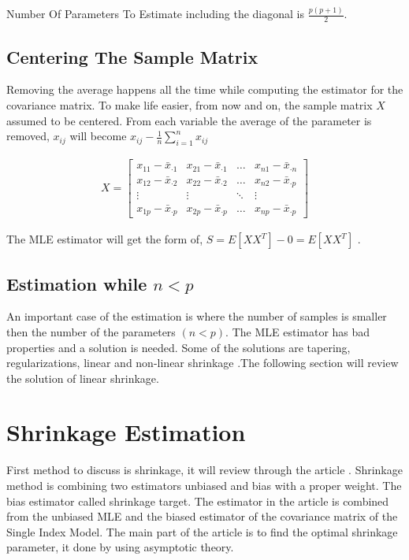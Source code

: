 \documentclass[letterpaper]{article}
\begin{document}
	Number Of Parameters To Estimate including the diagonal is \(\frac{p(p + 1)}{2} \).
	
	
	\subsection{Centering The Sample Matrix}	 
	Removing the average happens all the time while computing the estimator for the covariance
	matrix. To make life easier, from now and on, the sample matrix \(X\) assumed to be centered. From each variable the average of the parameter is removed, \(x_{ij}\)  will become \(x_{ij} -  \frac{1}{n} \sum_{i=1}^{n}x_{ij} \)
	
	
	\begin{align*} 
	X =
	\begin{bmatrix}
	x_{11} - \bar{x}_{\cdot 1} & x_{21} - \bar{x}_{\cdot 1} & \dots     & x_{n1} -\bar{x}_{\cdot n} \\
	x_{12} - \bar{x}_{\cdot 2} & x_{22} - \bar{x}_{\cdot 2} & \dots     & x_{n2} -\bar{x}_{\cdot p} \\
	\vdots  & \vdots  & \ddots  & \vdots  \\
	x_{1p} - \bar{x}_{\cdot p} & x_{2p} - \bar{x}_{\cdot p} & \dots     & x_{np} -\bar{x}_{\cdot p}
	\end{bmatrix}
	\end{align*}
	
	The MLE estimator will get the form of, \( S = E[XX^{T}] - 0 = E[XX^{T}] \) .  
	
	\subsection{Estimation while \(n < p\)} 
	An important case of the estimation is where the number of samples is smaller then the number of the parameters \((n < p)\). The  MLE estimator has bad properties and a solution is needed. Some of the solutions are tapering, regularizations, linear and non-linear shrinkage .The following section will review the solution of linear shrinkage. 

	
	\section{Shrinkage Estimation}
	First method to discuss is shrinkage, it will review through the article \textit{\cite{ledoit_wolf_2003}}. Shrinkage method is combining two estimators unbiased and bias with a proper weight. The bias estimator called shrinkage target. The estimator in the article is combined from the unbiased MLE and the biased estimator of the covariance matrix of the Single Index Model. The main part of the article is to find the optimal shrinkage parameter, it done by using asymptotic theory.  
	
\end{document}
